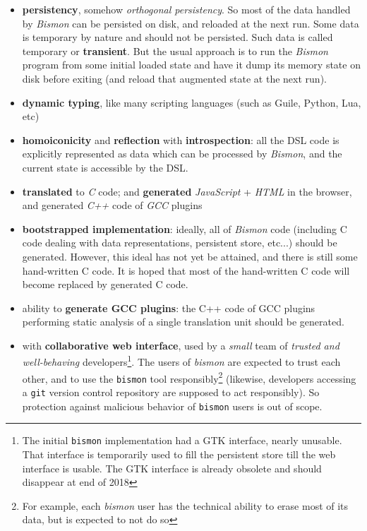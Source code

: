 \begin{itemize}

  \item \textbf{persistency}, somehow \textit{orthogonal
    persistency}. So most of the data handled by \textit{Bismon} can
    be persisted on disk, and reloaded at the next run. Some data is
    temporary by nature and should not be persisted. Such data is
    called temporary or \textbf{transient}. But the usual approach is
    to run the \textit{Bismon} program from some initial loaded state
    and have it dump its memory state on disk before exiting (and
    reload that augmented state at the next run).

  \item \textbf{dynamic typing}, like many scripting languages (such
    as Guile, Python, Lua, etc)

  \item \textbf{homoiconicity} and \textbf{reflection} with
    \textbf{introspection}: all the DSL code is explicitly represented
    as data which can be processed by \textit{Bismon}, and the current
    state is accessible by the DSL.

    \item \textbf{translated} to \emph{C} code; and \textbf{generated}
      \emph{JavaScript} + \emph{HTML} in the browser, and generated
      \emph{C++} code of \emph{GCC} plugins

    \item \textbf{bootstrapped implementation}: ideally, all of
      \textit{Bismon} code (including C code dealing with data
      representations, persistent store, etc...) should be
      generated. However, this ideal has not yet be attained, and
      there is still some hand-written C code. It is hoped that most
      of the hand-written C code will become replaced by generated C
      code.
    \item ability to \textbf{generate GCC plugins}: the C++ code of
      GCC plugins performing static analysis of a single translation
      unit should be generated.

    \item with \textbf{collaborative web interface}, used by a
      \emph{small} team of \emph{trusted and well-behaving}
      developers\footnote{The initial \texttt{bismon} implementation
        had a GTK interface, nearly unusable. That interface is
        temporarily used to fill the persistent store till the web
        interface is usable. The GTK interface is already obsolete and
        should disappear at end of 2018}. The users of \emph{bismon}
      are expected to trust each other, and to use the \texttt{bismon}
      tool responsibly\footnote{For example, each \emph{bismon} user
        has the technical ability to erase most of its data, but is
        expected to not do so} (likewise, developers accessing a
      \texttt{git} version control repository are supposed to act
      responsibly). So protection against malicious behavior of
      \texttt{bismon} users is out of scope.


\end{itemize}

